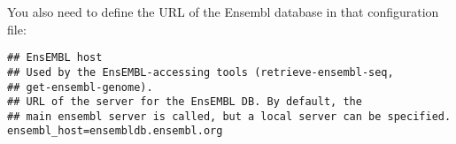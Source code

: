 \documentclass[12pt,a4paper, oneside]{scrreprt} %
\begin{document}
You also need to define the URL of the Ensembl database in that
configuration file:

\begin{lstlisting}
## EnsEMBL host
## Used by the EnsEMBL-accessing tools (retrieve-ensembl-seq,
## get-ensembl-genome).
## URL of the server for the EnsEMBL DB. By default, the
## main ensembl server is called, but a local server can be specified.
ensembl_host=ensembldb.ensembl.org
\end{lstlisting}





\end{document}
